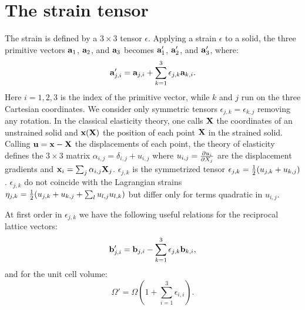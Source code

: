 \documentclass[12pt,a4paper]{article}
\begin{document}
\newpage

\section{\color{coral}The strain tensor}
The strain is defined by a $3\times 3$ tensor
$\epsilon$. Applying a strain $\epsilon$ to a solid, 
the three primitive vectors ${\bf a}_1$, ${\bf a}_2$, and ${\bf a}_3$
becomes 
${\bf a}'_1$, ${\bf a}'_2$, and ${\bf a}'_3$, where:
\begin{equation}
{\bf a}'_{j,i} = {\bf a}_{j,i} +  \sum_{k=1}^3 \epsilon_{j,k} {\bf a}_{k,i}.
\label{strain_def}
\end{equation}
Here $i=1,2,3$ is the index of the primitive vector, while $k$ and $j$ run
on the three Cartesian coordinates. We consider only symmetric tensors
$\epsilon_{j,k}=\epsilon_{k,j}$ removing any rotation. 
In the classical elasticity theory, one
calls ${\bf X}$ the coordinates of an unstrained solid and
${\bf x}({\bf X})$ the position of each point ${\bf X}$ in
the strained solid. Calling ${\bf u}= {\bf x} -{\bf X}$ the displacements
of each point, the theory of elasticity defines the $3\times3$ matrix
$\alpha_{i,j}=\delta_{i,j}+u_{i,j}$ where $u_{i,j}= {\partial u_i \over 
\partial X_j}$ are the displacement gradients and 
${\bf x}_i = \sum_j\alpha_{i,j} {\bf X}_j$. $\epsilon_{j,k}$
is the symmetrized tensor $\epsilon_{j,k}={1\over 2} ( u_{j,k} +
u_{k,j})$. $\epsilon_{j,k}$ do not coincide with the Lagrangian strains
$\eta_{j,k}={1\over 2} ( u_{j,k} + u_{k,j} + \sum_l u_{l,j}u_{l,k})$ but 
differ only for terms quadratic in $u_{i,j}$. 

At first order in $\epsilon_{j,k}$ we have
the following useful relations for the reciprocal lattice vectors:
\begin{equation}
{\bf b}'_{j,i} = {\bf b}_{j,i} -  \sum_{k=1}^3 \epsilon_{j,k} {\bf b}_{k,i},
\end{equation}
and for the unit cell volume:
\begin{equation}
\Omega'=\Omega \left( 1+\sum_{i=1}^3 \epsilon_{i,i} \right).
\end{equation}
\end{document}
